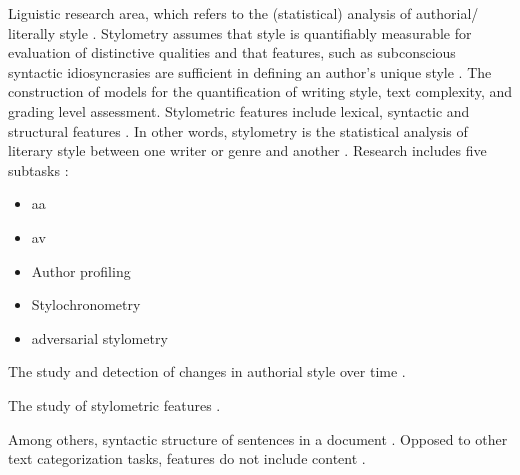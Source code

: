 \begin{definition}
    [Stylometry]
    Liguistic research area, which refers to the (statistical) analysis of authorial/ literally style \cite{elmanarelbouanani_authorship_2014,neal_surveying_2018}.
    Stylometry assumes that style is quantifiably measurable for evaluation of distinctive qualities and 
    that features, such as subconscious syntactic idiosyncrasies are sufficient in defining an author's unique style \cite{neal_surveying_2018}.
    The construction of models for the quantification of writing style, text complexity, and grading level assessment.
    Stylometric features include lexical, syntactic and structural features \cite{stein_intrinsic_2011}.
    In other words, stylometry is the statistical analysis of literary style between one writer or genre and another \cite{tyo_state_2022}.
    Research includes five subtasks \cite{neal_surveying_2018}:
    \begin{itemize}
        \item \ac{aa}
        \item \ac{av}
        \item Author profiling
        \item Stylochronometry
        \item adversarial stylometry
    \end{itemize}
\end{definition}

\begin{definition}
    [Stylochronometry]
    The study and detection of changes in authorial style over time \cite{neal_surveying_2018}.
\end{definition}

\begin{definition}
    [Stylistics]
    The study of stylometric features \cite{elmanarelbouanani_authorship_2014,abbasi_writeprints_2008}.
\end{definition}

\begin{definition}
    Among others, syntactic structure of sentences in a document \cite{jafariakinabad_self_supervised_2022}.
    Opposed to other text categorization tasks, features do not include content \cite{koppel_authorship_2004}.
\end{definition}

